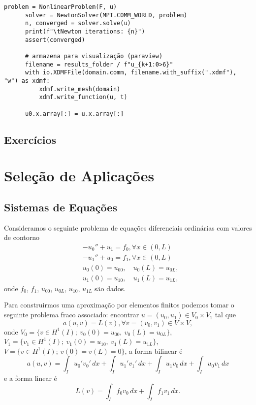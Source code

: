 \begin{ex}
\begin{lstlisting}[caption=ex\_mef1d\_fisher.py]
      problem = NonlinearProblem(F, u)
      solver = NewtonSolver(MPI.COMM_WORLD, problem)
      n, converged = solver.solve(u)
      print(f"\tNewton iterations: {n}")
      assert(converged)
  
      # armazena para visualização (paraview)
      filename = results_folder / f"u_{k+1:0>6}"
      with io.XDMFFile(domain.comm, filename.with_suffix(".xdmf"), "w") as xdmf:
          xdmf.write_mesh(domain)
          xdmf.write_function(u, t)
  
      u0.x.array[:] = u.x.array[:]  
\end{lstlisting}
\end{ex}

\subsection{Exercícios}
\badgeConstrucao


\section{Seleção de Aplicações}\label{cap_mef1d_sec_aps}
\badgeRevisar

\subsection{Sistemas de Equações}
\badgeRevisar

Consideramos o seguinte problema de equações diferenciais ordinárias com valores de contorno
\begin{align}
  &-u_0'' + u_1 = f_0,\forall x\in (0, L)\\ 
  &-u_1'' + u_0 = f_1,\forall x\in (0, L)\\
  &u_0(0)=u_{00},\quad u_0(L)=u_{0L},\\
  &u_1(0)=u_{10},\quad u_1(L)=u_{1L},
\end{align}
onde $f_0$, $f_1$, $u_{00}$, $u_{0L}$, $u_{10}$, $u_{1L}$ são dados.

Para construirmos uma aproximação por elementos finitos podemos tomar o seguinte problema fraco associado: encontrar $u = (u_0, u_1)\in V_0\times V_1$ tal que
\begin{equation}
  a(u, v) = L(v), \forall v = (v_0, v_1)\in V\times V,
\end{equation}
onde $V_0 = \{v\in H^1(I);~v_0(0)=u_{00},~v_0(L)=u_{0L}\}$, $V_1=\{v_1\in H^1(I);~v_1(0)=u_{10},~v_1(L)=u_{1L}\}$, $V = \{v\in H^1(I);~v(0)=v(L)=0\}$, a forma bilinear é
\begin{equation}\label{eq:sis_lin_bilinear}
  a(u, v) = \int_{I} u_0'v_0'\,dx + \int_{I} u_1'v_1'\,dx + \int_{I} u_1v_0\,dx + \int_{I} u_0v_1\,dx
\end{equation}
e a forma linear é
\begin{equation}\label{eq:sis_lin_linear}
  L(v) = \int_I f_0v_0\,dx + \int_I f_1v_1\,dx.
\end{equation}

